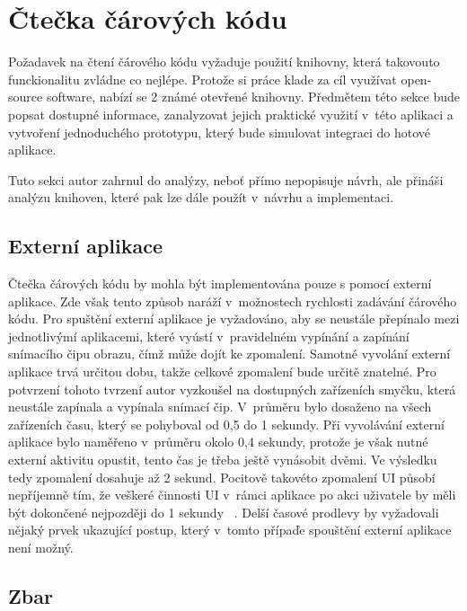 \documentclass[thesis=B,czech]{FITthesis}[2013/10/20]
\begin{document}
\clearpage

\section{Čtečka čárových kódu}

Požadavek na čtení čárového kódu vyžaduje použití knihovny, která takovouto funckionalitu zvládne co nejlépe. Protože si práce klade za cíl využívat open-source software, nabízí se 2 známé otevřené knihovny. Předmětem této sekce bude popsat dostupné informace, zanalyzovat jejich praktické využití v~této aplikaci a vytvoření jednoduchého prototypu, který bude simulovat integraci do hotové aplikace.

Tuto sekci autor zahrnul do analýzy, neboť přímo nepopisuje návrh, ale přináši analýzu knihoven, které pak lze dále použít v~návrhu a implementaci.

\subsection{Externí aplikace}

Čtečka čárových kódu by mohla být implementována pouze s pomocí externí aplikace. Zde však tento způsob naráží v~možnostech rychlosti zadávání čárového kódu. Pro spuštění externí aplikace je vyžadováno, aby se neustále přepínalo mezi jednotlivýmí aplikacemi, které vyústí v~pravidelném vypínání a zapínání snímacího čipu obrazu, čímž může dojít ke zpomalení. Samotné vyvolání externí aplikace trvá určitou dobu, takže celkové zpomalení bude určitě znatelné. Pro potvrzení tohoto tvrzení autor vyzkoušel na dostupných zařízeních smyčku, která neustále zapínala a vypínala snímací čip. V~průměru bylo dosaženo na všech zařízeních času, který se pohyboval od 0,5 do 1 sekundy. Při vyvolávání externí aplikace bylo naměřeno v~průměru okolo 0,4 sekundy, protože je však nutné externí aktivitu opustit,  tento čas je třeba ještě vynásobit dvěmi. Ve výsledku tedy zpomalení dosahuje až 2 sekund. Pocitově takovéto zpomalení UI působí nepříjemně tím, že veškeré činnosti UI v~rámci aplikace po akci uživatele by měli být dokončené nejpozději do 1 sekundy ~\cite{ui_maxlag}. Delší časové prodlevy by vyžadovali nějaký prvek ukazující postup, který v~tomto přípaďe spouštění externí aplikace není možný.

\subsection{Zbar ~\cite{zbar}}
\end{document}
